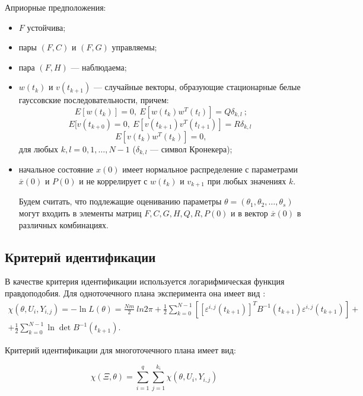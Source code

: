 \documentclass[a4paper,14pt]{extarticle}
\renewcommand{\vec}[1]{#1}
\newcommand{\eps}{\varepsilon}
\begin{document}
\bigskip
Априорные предположения:
\begin{itemize}
\item $F$ устойчива;
\item пары $(F, C)$ и $(F, G)$ управляемы;
\item пара $(F, H)$ --- наблюдаема;
\item $\vec{w}(t_k)$ и $\vec{v}(t_{k+1})$ --- случайные векторы, образующие
стационарные белые гауссовские последовательности, причем:
\[
E[\vec{w}(t_k)] = 0,\ E[\vec{w}(t_k)\vec{w}^{T}(t_l)] = Q \delta_{k,l}\ ;
\]
\[
E[\vec{v}(t_{k+0}) = 0,\ E[\vec{v}(t_{k+1})\vec{v}^{T}(t_{l+1})] = R
\delta_{k,l}\;
\]
\[
E[\vec{v}(t_k)\vec{w}^{T}(t_k)] = 0,
\]
для любых $k, l = 0, 1, \ldots, N-1$ ($\delta_{k,l}$ --- символ Кронекера);

\item начальное состояние $\vec{x}(0)$ имеет нормальное распределение с
параметрами $\overline{\vec{x}}(0)$ и $P(0)$ и не коррелирует с $\vec{w(t_k)}$
и $\vec{v_{k+1}}$ при любых значениях $k$.

Будем считать, что подлежащие оцениванию параметры $\theta = (\theta_1,
\theta_2, \ldots, \theta_s)$ могут входить в элементы матриц $F, C, G, H, Q, R,
P(0)$ и в вектор $\overline{\vec{x}}(0)$ в различных комбинациях.

\end{itemize}

\subsection{Критерий идентификации}

В качестве критерия идентификации используется логарифмическая функция
правдоподобия. Для одноточечного плана эксперимента она имеет вид \cite{mono}:
\begin{equation*}
\begin{split}
	\chi(\theta, U_i, Y_{i,j}) = -\ln{L(\theta)} =
	\frac{Nm}{2}\ ln{2\pi} + \frac{1}{2}
	\sum\limits_{k=0}^{N-1} \left[ [\eps^{i,j}(t_{k+1})]^T 
	B^{-1}(t_{k+1}) \eps^{i,j}(t_{k+1}) \right]
  + \\ + \frac{1}{2} \sum\limits_{k=0}^{N-1} \ln \det B^{-1}(t_{k+1}).
\end{split}
\end{equation*}

Критерий идентификации для многоточечного плана имеет вид:

\begin{equation*}
	\chi(\Xi, \theta) =
		\sum\limits_{i=1}^{q} \sum\limits_{j=1}^{k_i} \chi(\theta, U_i, Y_{i,j})
\end{equation*}
\end{document}
